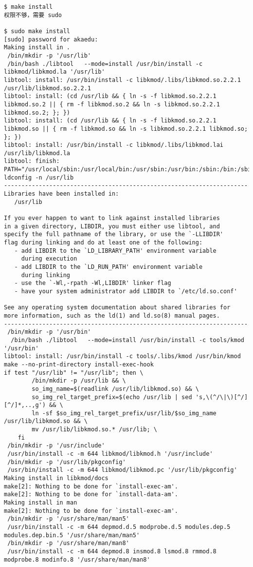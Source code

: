 \documentclass[11pt,a4paper]{article}
\begin{document}
{\begin{shaded}\begin{verbatim}
$ make install
权限不够，需要 sudo

$ sudo make install
[sudo] password for akaedu: 
Making install in .
 /bin/mkdir -p '/usr/lib'
 /bin/bash ./libtool   --mode=install /usr/bin/install -c   libkmod/libkmod.la '/usr/lib'
libtool: install: /usr/bin/install -c libkmod/.libs/libkmod.so.2.2.1 /usr/lib/libkmod.so.2.2.1
libtool: install: (cd /usr/lib && { ln -s -f libkmod.so.2.2.1 libkmod.so.2 || { rm -f libkmod.so.2 && ln -s libkmod.so.2.2.1 libkmod.so.2; }; })
libtool: install: (cd /usr/lib && { ln -s -f libkmod.so.2.2.1 libkmod.so || { rm -f libkmod.so && ln -s libkmod.so.2.2.1 libkmod.so; }; })
libtool: install: /usr/bin/install -c libkmod/.libs/libkmod.lai /usr/lib/libkmod.la
libtool: finish: PATH="/usr/local/sbin:/usr/local/bin:/usr/sbin:/usr/bin:/sbin:/bin:/sbin" ldconfig -n /usr/lib
----------------------------------------------------------------------
Libraries have been installed in:
   /usr/lib

If you ever happen to want to link against installed libraries
in a given directory, LIBDIR, you must either use libtool, and
specify the full pathname of the library, or use the `-LLIBDIR'
flag during linking and do at least one of the following:
   - add LIBDIR to the `LD_LIBRARY_PATH' environment variable
     during execution
   - add LIBDIR to the `LD_RUN_PATH' environment variable
     during linking
   - use the `-Wl,-rpath -Wl,LIBDIR' linker flag
   - have your system administrator add LIBDIR to `/etc/ld.so.conf'

See any operating system documentation about shared libraries for
more information, such as the ld(1) and ld.so(8) manual pages.
----------------------------------------------------------------------
 /bin/mkdir -p '/usr/bin'
  /bin/bash ./libtool   --mode=install /usr/bin/install -c tools/kmod '/usr/bin'
libtool: install: /usr/bin/install -c tools/.libs/kmod /usr/bin/kmod
make --no-print-directory install-exec-hook
if test "/usr/lib" != "/usr/lib"; then \
        /bin/mkdir -p /usr/lib && \
        so_img_name=$(readlink /usr/lib/libkmod.so) && \
        so_img_rel_target_prefix=$(echo /usr/lib | sed 's,\(^/\|\)[^/][^/]*,..,g') && \
        ln -sf $so_img_rel_target_prefix/usr/lib/$so_img_name /usr/lib/libkmod.so && \
        mv /usr/lib/libkmod.so.* /usr/lib; \
    fi
 /bin/mkdir -p '/usr/include'
 /usr/bin/install -c -m 644 libkmod/libkmod.h '/usr/include'
 /bin/mkdir -p '/usr/lib/pkgconfig'
 /usr/bin/install -c -m 644 libkmod/libkmod.pc '/usr/lib/pkgconfig'
Making install in libkmod/docs
make[2]: Nothing to be done for `install-exec-am'.
make[2]: Nothing to be done for `install-data-am'.
Making install in man
make[2]: Nothing to be done for `install-exec-am'.
 /bin/mkdir -p '/usr/share/man/man5'
 /usr/bin/install -c -m 644 depmod.d.5 modprobe.d.5 modules.dep.5 modules.dep.bin.5 '/usr/share/man/man5'
 /bin/mkdir -p '/usr/share/man/man8'
 /usr/bin/install -c -m 644 depmod.8 insmod.8 lsmod.8 rmmod.8 modprobe.8 modinfo.8 '/usr/share/man/man8'
\end{verbatim}\end{shaded}}
\end{document}
